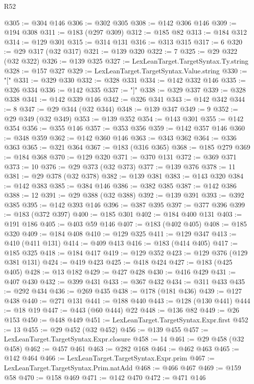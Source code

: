 \begin{lexlean}{R52}
\begin{coremodule}
@305 := @304 @146
@306 := @302 @305
@308 := @142 @306 @146
@309 := @194 @308
@311 := @183 (@297 @309)
@312 := @185 @82
@313 := @184 @312
@314 := @129 @301
@315 := @314 @131
@316 := @313 @315
@317 := 6
@320 := @29 @317 (@32 @317)
@321 := @139 @320
@322 := 7
@325 := @29 @322 (@32 @322)
@326 := @139 @325
@327 := LexLeanTarget.TargetSyntax.Ty.string
@328 := @157 @327
@329 := LexLeanTarget.TargetSyntax.Value.string
@330 := "["
@331 := @329 @330
@332 := @328 @331
@334 := @142 @332 @146
@335 := @326 @334
@336 := @142 @335
@337 := "]"
@338 := @329 @337
@339 := @328 @338
@341 := @142 @339 @146
@342 := @326 @341
@343 := @142 @342
@344 := 8
@347 := @29 @344 (@32 @344)
@348 := @139 @347
@349 := 9
@352 := @29 @349 (@32 @349)
@353 := @139 @352
@354 := @143 @301
@355 := @142 @354
@356 := @355 @146
@357 := @353 @356
@359 := @142 @357 @146
@360 := @348 @359
@362 := @142 @360 @146
@363 := @343 @362
@364 := @336 @363
@365 := @321 @364
@367 := @183 (@316 @365)
@368 := @185 @279
@369 := @184 @368
@370 := @129 @320
@371 := @370 @131
@372 := @369 @371
@373 := 10
@376 := @29 @373 (@32 @373)
@377 := @139 @376
@378 := 11
@381 := @29 @378 (@32 @378)
@382 := @139 @381
@383 := @143 @320
@384 := @142 @383
@385 := @384 @146
@386 := @382 @385
@387 := @142 @386
@388 := 12
@391 := @29 @388 (@32 @388)
@392 := @139 @391
@393 := @392 @385
@395 := @142 @393 @146
@396 := @387 @395
@397 := @377 @396
@399 := @183 (@372 @397)
@400 := @185 @301
@402 := @184 @400 @131
@403 := @191 @186
@405 := @403 @59 @146
@407 := @183 (@402 @405)
@408 := @185 @320
@409 := @184 @408
@410 := @129 @325
@411 := @129 @347
@413 := @410 (@411 @131)
@414 := @409 @413
@416 := @183 (@414 @405)
@417 := @185 @325
@418 := @184 @417
@419 := @129 @352
@423 := @129 @376 (@129 @381 @131)
@424 := @419 @423
@425 := @418 @424
@427 := @183 (@425 @405)
@428 := @13 @182
@429 := @427 @428
@430 := @416 @429
@431 := @407 @430
@432 := @399 @431
@433 := @367 @432
@434 := @311 @433
@435 := @292 @434
@436 := @269 @435
@438 := @178 (@181 @436)
@439 := @127 @438
@440 := @271 @131
@441 := @188 @440
@443 := @128 (@130 @441)
@444 := @18 @19
@447 := @443 (@60 @444) @22
@448 := @136 @82
@449 := @26 @153
@450 := @448 @449
@451 := LexLeanTarget.TargetSyntax.Expr.first
@452 := 13
@455 := @29 @452 (@32 @452)
@456 := @139 @455
@457 := LexLeanTarget.TargetSyntax.Expr.closure
@458 := 14
@461 := @29 @458 (@32 @458)
@462 := @457 @461
@463 := @282 @168
@464 := @462 @463
@465 := @142 @464
@466 := LexLeanTarget.TargetSyntax.Expr.prim
@467 := LexLeanTarget.TargetSyntax.Prim.natAdd
@468 := @466 @467
@469 := @159 @58
@470 := @158 @469
@471 := @142 @470
@472 := @471 @146

\end{coremodule}
\end{lexlean}
